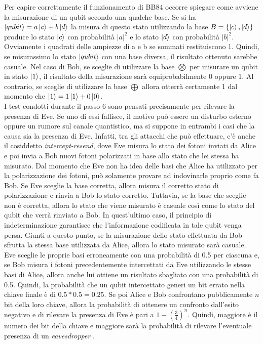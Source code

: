 Per capire correttamente il funzionamento di BB84 occorre spiegare come avviene la misurazione di un qubit secondo una qualche base. Se si ha $\ket{qubit} = a\ket{c} + b\ket{d}$ la misura di questo stato utilizzando la base $B = \{\ket{c}, \ket{d}\}$ produce lo stato $\ket{c}$ con probabilità $|a|^2$  e lo stato $\ket{d}$ con probabilità $|b|^2$. Ovviamente i quadrati delle ampiezze di a e b se sommati restituiscono 1. Quindi, se misurassimo lo stato $\ket{qubit}$ con una base diversa, il risultato ottenuto sarebbe casuale. Nel caso di Bob, se sceglie di utilizzare la base $\bigotimes$ per misurare un qubit in stato $\ket{1}$, il risultato della misurazione sarà equiprobabilmente 0 oppure 1. Al contrario, se sceglie di utilizzare la base $\bigoplus$ allora otterrà certamente 1 dal momento che $\ket{1} = 1\ket{1}+0\ket{0}$.\\

I test condotti durante il passo 6 sono pensati precisamente per rilevare la presenza di Eve. Se uno di essi fallisce, il motivo può essere un disturbo esterno oppure un rumore sul canale quantistico, ma si suppone in entrambi i casi che la causa sia la presenza di Eve. Infatti, tra gli attacchi che può effettuare, c'è anche il cosiddetto \textit{intercept-resend}, dove Eve misura lo stato dei fotoni inviati da Alice e poi invia a Bob nuovi fotoni polarizzati in base allo stato che lei stessa ha misurato. Dal momento che Eve non ha idea delle basi che Alice ha utilizzato per la polarizzazione dei fotoni, può solamente provare ad indovinarle proprio come fa Bob. Se Eve sceglie la base corretta, allora misura il corretto stato di polarizzazione e rinvia a Bob lo stato corretto. Tuttavia, se la base che sceglie non è corretta, allora lo stato che viene misurato è casuale così come lo stato del qubit che verrà rinviato a Bob. In quest'ultimo caso, il principio di indeterminazione garantisce che l'informazione codificata in tale qubit venga persa. Giunti a questo punto, se la misurazione dello stato effettuata da Bob sfrutta la stessa base utilizzata da Alice, allora lo stato misurato sarà casuale. \\

Eve sceglie le proprie basi erroneamente con una probabilità di 0.5 per ciascuna e, se Bob misura i fotoni precedentemente intercettati da Eve utilizzando le stesse basi di Alice, allora anche lui ottiene un risultato sbagliato con una probabilità di 0.5. Quindi, la probabilità che un qubit intercettato generi un bit errato nella chiave finale è di $0.5 * 0.5 = 0.25$. Se poi Alice e Bob confrontano pubblicamente $n$ bit della loro chiave, allora la probabilità di ottenere un confronto dall'esito negativo e di rilevare la presenza di Eve è pari a $1 - (\frac{3}{4})^n$. Quindi, maggiore è il numero dei bit della chiave e maggiore sarà la probabilità di rilevare l'eventuale presenza di un \textit{eavesdropper} \cite{elboukhari}. \\

